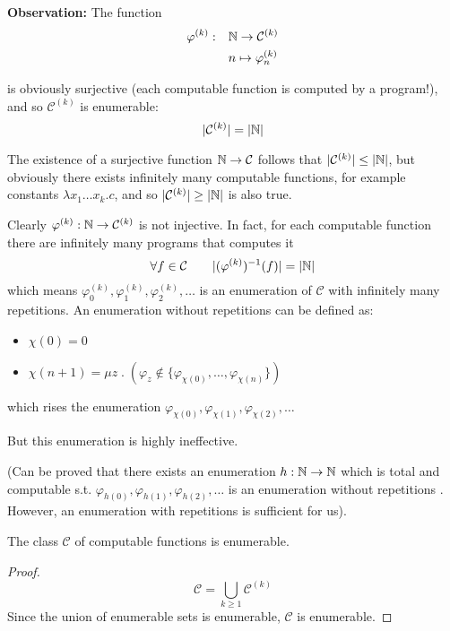 \textbf{Observation:} The function \[
  \begin{split}
    \varphi^{(k)} : & \quad \mathbb{N} \to \mathcal{C}^{(k)} \\
    & \quad n \mapsto \varphi_n^{(k)}
  \end{split}
\]

is obviously surjective (each computable function is computed by a
program!), and so $\mathcal{C}^{(k)}$ is enumerable:
\[|\mathcal{C}^{(k)}| = |\mathbb{N}|\]

The existence of a surjective function $\mathbb{N} \to \mathcal{C}$
follows that $|\mathcal{C}^{(k)}| \leq |\mathbb{N}|$, but obviously there
exists infinitely many computable functions, for example constants
$\lambda x_1 \dots x_k . c$, and so $|\mathcal{C}^{(k)}| \geq |\mathbb{N}|$
is also true.

Clearly $\varphi^{(k)} : \mathbb{N} \to \mathcal{C}^{(k)}$ is not
injective. In fact, for each computable function there are infinitely
many programs that computes it
\[\forall f \in \mathcal{C} \quad \quad |(\varphi^{(k)})^{-1}(f)| =
  |\mathbb{N}|\] which means
\(\varphi_0^{(k)}, \varphi_1^{(k)}, \varphi_2^{(k)}, \dots\) is an
enumeration of $\mathcal{C}$ with infinitely many repetitions. An
enumeration without repetitions can be defined as:
\begin{itemize}
\item[] $\chi(0) = 0$
\item[]
  $\chi(n+1) = \mu z \; . \; (\varphi_z \notin \{\varphi_{\chi(0)},
  \dots, \varphi_{\chi(n)}\})$
\end{itemize}
which rises the enumeration
$\varphi_{\chi(0)}, \varphi_{\chi(1)}, \varphi_{\chi(2)}, \dots$

But this enumeration is highly ineffective.

(Can be proved that there exists an enumeration
$h : \mathbb{N} \to \mathbb{N}$ which is total and computable s.t.
$\varphi_{h(0)}, \varphi_{h(1)}, \varphi_{h(2)}, \dots$ is an
enumeration without repetitions \cite{firedberg:1958}. However, an
enumeration with repetitions is sufficient for us).

\begin{theorem}[$|\mathcal{C}| = |\nat|$]
  The class $\mathcal{C}$ of computable functions is enumerable.
  \begin{proof}
    \[ \mathcal{C} = \bigcup_{k \geq 1}\mathcal{C}^{(k)} \] Since the
    union of enumerable sets is enumerable, $\mathcal{C}$ is
    enumerable.
  \end{proof}
\end{theorem}

